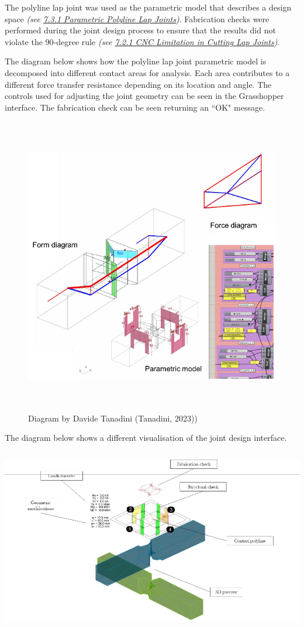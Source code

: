 \documentclass[11pt]{book}
\begin{document}
The polyline lap joint was used as the parametric model that describes a design space \textit{(see \uline{7.3.1 Parametric Polyline Lap Joints})}. Fabrication checks were performed during the joint design process to ensure that the results did not violate the 90-degree rule \textit{(see \uline{7.2.1 CNC Limitation in Cutting Lap Joints})}. 

The diagram below shows how the polyline lap joint parametric model is decomposed into different contact areas for analysis. Each area contributes to a different force transfer resistance depending on its location and angle. The controls used for adjusting the joint geometry can be seen in the Grasshopper interface. The fabrication check can be seen returning an ``OK" message.

\begin{figure}[H]
\includegraphics[width=14.33cm,height=13.04cm]{./images/image4.png}
\caption{Diagram by Davide Tanadini (Tanadini, 2023))}
\label{fig:diagram_davide_tanadini_tanadini_2023}
\end{figure}


\vspace{1\baselineskip}
The diagram below shows a different visualisation of the joint design interface. \includegraphics[width=15.92cm,height=8.78cm]{./images/image5.png}
\end{document}
